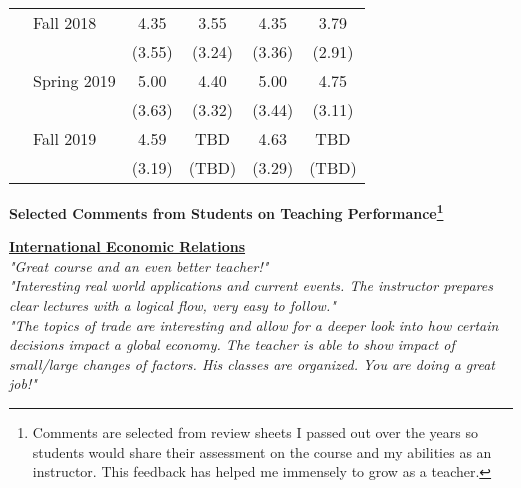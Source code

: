 \documentclass[a4paper,11pt]{article}
\begin{document}
\begin{table}[htbp]
{\begin{threeparttable}
\begin{tabular}{|l|l|c|c|c|c|}
& Fall 2018 & 4.35 & 3.55 & 4.35 & 3.79 \\
& & (3.55) & (3.24) & (3.36) & (2.91) \\

& Spring 2019 & 5.00 & 4.40 & 5.00 & 4.75 \\
& & (3.63) & (3.32) & (3.44) & (3.11) \\

& Fall 2019 & 4.59 & TBD & 4.63 & TBD \\
& & (3.19) & (TBD) & (3.29) & (TBD) \\
\hline 





\hline 
\end{tabular}
\end{threeparttable}
}
\end{table}


\newpage

\begin{center}
 \textbf{\large{Selected Comments from Students on Teaching Performance\footnote{Comments are selected from review sheets I passed out over the years so students would share their assessment on the course and my abilities as an instructor. This feedback has helped me immensely to grow as a teacher.}}}\\
 \end{center}
 
\medskip

\ul{\textbf{International Economic Relations}} \\

\textit{"Great course and an even better teacher!"} \\

\textit{"Interesting real world applications and current events. The instructor prepares clear lectures with a logical flow, very easy to follow."} \\

\textit{"The topics of trade are interesting and allow for a deeper look into how certain decisions impact a global economy. The teacher is able to show impact of small/large changes of factors. His classes are organized. You are doing a great job!"} \\
\end{document}
